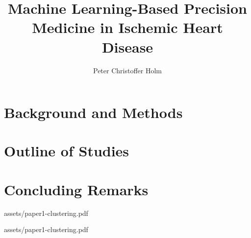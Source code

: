 \documentclass[a4paper, twoside, nobib]{tufte-book}
\title[ML-based precision medicine in ischemic heart disease]{%
    Machine Learning-Based Precision Medicine in Ischemic Heart Disease}
\author[Peter Christoffer Holm]{Peter Christoffer Holm}
\begin{document}
\frontmatter
\kutitlepage
\maketitlepage

  

        
        

\cleardoublepage

\tableofcontents
\listoffigures
\listoftables

      

\cleardoublepage
   

\mainmatter %

\part{Background and Methods}
       
   
  
    

\part{Outline of Studies}
 
 
 

\part{Concluding Remarks}
      

\backmatter %

\printbibliography

\mainmatter %

\appendix
\appendixpage
\addappheadtotoc
\cleardoublepage

%
    {assets/paper1-clustering.pdf}

%
    {assets/paper1-clustering.pdf}
\end{document}
